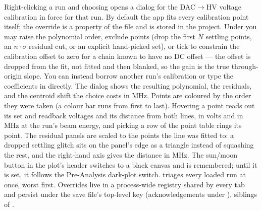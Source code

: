 Right-clicking a run and choosing  opens a dialog
for the DAC$\rightarrow$HV voltage calibration in force for that run. By
default the app fits every calibration point itself; the override is a
property of the file and is stored in the project. Under
 you may raise the polynomial order,
exclude points (drop the first $N$ settling points, an $n\!\cdot\!\sigma$
residual cut, or an explicit hand-picked set), or tick
 to constrain the
calibration offset to zero for a chain known to have no DC offset --- the
offset is dropped from the fit, not fitted and then blanked, so the
gain is the true through-origin slope. You can instead borrow another
run's calibration or type the coefficients in directly. The dialog shows
the resulting polynomial, the residuals, and the centroid shift the
choice costs in MHz. Points are coloured by the order they were taken
(a colour bar runs from first to last). Hovering a point reads out its
set and readback voltages and its distance from both lines, in volts
and in MHz at the run's beam energy, and picking a row of the point
table rings its point. The residual panels are scaled to the points the
line was fitted to: a dropped settling glitch sits on the panel's edge
as a triangle instead of squashing the rest, and the right-hand axis
gives the distance in MHz. The sun/moon button in the plot's header
switches to a black canvas and is remembered; until it is set, it
follows the Pre-Analysis dark-plot switch.  triages every
loaded run at once, worst first. Overrides live in a process-wide
registry shared by every tab and persist under the save file's
top-level  key (acknowledgements under
), siblings of .
